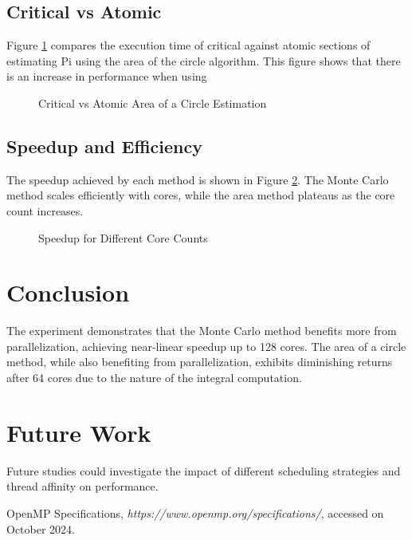\documentclass[conference]{IEEEtran}
\begin{document}
\subsection{Critical vs Atomic}
Figure \ref{fig:critical_atomic} compares the execution time of critical against atomic sections of estimating Pi using the area of the circle algorithm.
This figure shows that there is an increase in performance when using 

\begin{figure}[H]
    \centering
    \caption{Critical vs Atomic Area of a Circle Estimation}
    \label{fig:critical_atomic}
\end{figure}

\subsection{Speedup and Efficiency}
The speedup achieved by each method is shown in Figure \ref{fig:speedup}. The Monte Carlo method scales efficiently with cores, while the area method plateaus as the core count increases.

\begin{figure}[H]
    \centering
    \caption{Speedup for Different Core Counts}
    \label{fig:speedup}
\end{figure}

\section{Conclusion}
The experiment demonstrates that the Monte Carlo method benefits more from parallelization, achieving near-linear speedup up to 128 cores. The area of a circle method, while also benefiting from parallelization, exhibits diminishing returns after 64 cores due to the nature of the integral computation.

\section{Future Work}
Future studies could investigate the impact of different scheduling strategies and thread affinity on performance.

\begin{thebibliography}{1}
 OpenMP Specifications, \textit{https://www.openmp.org/specifications/}, accessed on October 2024.
\end{thebibliography}
\end{document}
